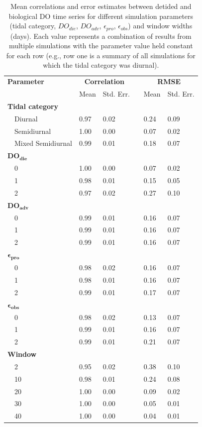 \documentclass[letterpaper,12pt,oneside]{article}\usepackage[]{graphicx}\usepackage[]{color}
\begin{document}

%
\begin{table}[!tbp]
\caption{Mean correlations and error estimates between detided and biological \ac{DO} time series for different simulation parameters (tidal category, $DO_{die}$, $DO_{adv}$, $\epsilon_{pro}$, $\epsilon_{obs}$) and window widths (days).  Each value represents a combination of results from multiple simulations with the parameter value held constant for each row (e.g., row one is a summary of all simulations for which the tidal category was diurnal).\label{tab:dtd_perf}} 
\begin{center}
\begin{tabular}{lllcll}
\hline\hline
\multicolumn{1}{l}{\bfseries Parameter}&\multicolumn{2}{c}{\bfseries Correlation}&\multicolumn{1}{c}{\bfseries }&\multicolumn{2}{c}{\bfseries RMSE}\tabularnewline
\cline{2-3} \cline{5-6}
\multicolumn{1}{l}{}&\multicolumn{1}{c}{Mean}&\multicolumn{1}{c}{Std. Err.}&\multicolumn{1}{c}{}&\multicolumn{1}{c}{Mean}&\multicolumn{1}{c}{Std. Err.}\tabularnewline
\hline
{\bfseries Tidal category}&&&&&\tabularnewline
~~Diurnal&0.97&0.02&&0.24&0.09\tabularnewline
~~Semidiurnal&1.00&0.00&&0.07&0.02\tabularnewline
~~Mixed Semidiurnal&0.99&0.01&&0.18&0.07\tabularnewline
\hline
{\bfseries $\boldsymbol{DO_{die}}$}&&&&&\tabularnewline
~~0&1.00&0.00&&0.07&0.02\tabularnewline
~~1&0.98&0.01&&0.15&0.05\tabularnewline
~~2&0.97&0.02&&0.27&0.10\tabularnewline
\hline
{\bfseries $\boldsymbol{DO_{adv}}$}&&&&&\tabularnewline
~~0&0.99&0.01&&0.16&0.07\tabularnewline
~~1&0.99&0.01&&0.16&0.07\tabularnewline
~~2&0.99&0.01&&0.16&0.07\tabularnewline
\hline
{\bfseries $\boldsymbol{\epsilon_{pro}}$}&&&&&\tabularnewline
~~0&0.98&0.02&&0.16&0.07\tabularnewline
~~1&0.98&0.01&&0.16&0.07\tabularnewline
~~2&0.99&0.01&&0.17&0.07\tabularnewline
\hline
{\bfseries $\boldsymbol{\epsilon_{obs}}$}&&&&&\tabularnewline
~~0&0.98&0.02&&0.13&0.07\tabularnewline
~~1&0.99&0.01&&0.16&0.07\tabularnewline
~~2&0.99&0.01&&0.21&0.07\tabularnewline
\hline
{\bfseries Window}&&&&&\tabularnewline
~~2&0.95&0.02&&0.38&0.10\tabularnewline
~~10&0.98&0.01&&0.24&0.08\tabularnewline
~~20&1.00&0.00&&0.09&0.02\tabularnewline
~~30&1.00&0.00&&0.05&0.01\tabularnewline
~~40&1.00&0.00&&0.04&0.01\tabularnewline
\hline
\end{tabular}
\end{center}
\end{table}
\end{document}
